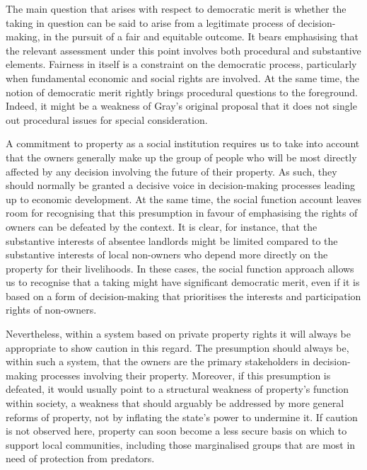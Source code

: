 The main question that arises with respect to democratic merit is whether the taking in question 
can be said to arise from a legitimate process of decision-making, in the pursuit of a fair and equitable outcome. It bears emphasising that the relevant assessment under this point involves both procedural and substantive elements. Fairness in itself is a constraint on the democratic process, particularly when fundamental economic and social rights are involved. At the same time, the notion of democratic merit rightly brings procedural questions to the foreground. Indeed, it might be a weakness of Gray's original proposal that it does not single out procedural issues for special consideration.


A commitment to property as a social institution requires us to take into account that the owners generally make up the group of people who will be most directly affected by any decision involving the future of their property. As such, they should normally be granted a decisive voice in decision-making processes leading up to economic development. At the same time, the social function account leaves room for recognising that this presumption in favour of emphasising the rights of owners can be defeated by the context. It is clear, for instance, that the substantive interests of absentee landlords might be limited compared to the substantive interests of local non-owners who depend more directly on the property for their livelihoods. In these cases, the social function approach allows us to recognise that a taking might have significant democratic merit, even if it is based on a form of decision-making that prioritises the interests and participation rights of non-owners.

Nevertheless, within a system based on private property rights it will always be appropriate to show caution in this regard. The presumption should always be, within such a system, that the owners are the primary stakeholders in decision-making processes involving their property. Moreover, if this presumption is defeated, it would usually point to a structural weakness of property's function within society, a weakness that should arguably be addressed by more general reforms of property, not by inflating the state's power to undermine it. If caution is not observed here, property can soon become a less secure basis on which to support local communities, including those marginalised groups that are most in need of protection from predators.

